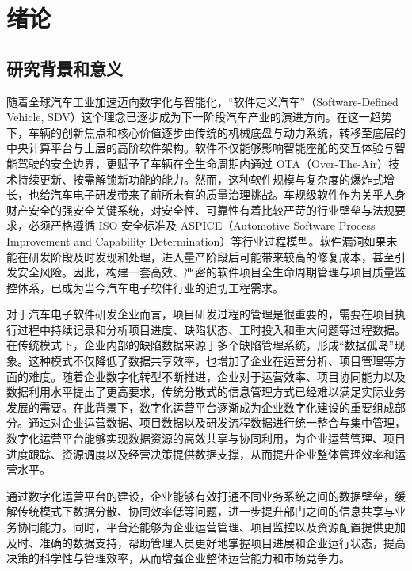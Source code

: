 \chapter{绪论}

\section{研究背景和意义}

随着全球汽车工业加速迈向数字化与智能化，“软件定义汽车”（Software-Defined Vehicle, SDV）这个理念已逐步成为下一阶段汽车产业的演进方向\cite{ibmsoftwaredefinedvehicle}。在这一趋势下，车辆的创新焦点和核心价值逐步由传统的机械底盘与动力系统，转移至底层的中央计算平台与上层的高阶软件架构。软件不仅能够影响智能座舱的交互体验与智能驾驶的安全边界，更赋予了车辆在全生命周期内通过 OTA（Over-The-Air）技术持续更新、按需解锁新功能的能力\cite{iso24089_2023}。然而，这种软件规模与复杂度的爆炸式增长，也给汽车电子研发带来了前所未有的质量治理挑战。车规级软件作为关乎人身财产安全的强安全关键系统，对安全性、可靠性有着比较严苛的行业壁垒与法规要求，必须严格遵循 ISO 安全标准\cite{iso21434_2021}及 ASPICE\cite{vda2023automotiveSpice}（Automotive Software Process Improvement and Capability Determination）等行业过程模型。软件漏洞如果未能在研发阶段及时发现和处理，进入量产阶段后可能带来较高的修复成本，甚至引发安全风险。因此，构建一套高效、严密的软件项目全生命周期管理与项目质量监控体系，已成为当今汽车电子软件行业的迫切工程需求。

对于汽车电子软件研发企业而言，项目研发过程的管理是很重要的，需要在项目执行过程中持续记录和分析项目进度、缺陷状态、工时投入和重大问题等过程数据。在传统模式下，企业内部的缺陷数据来源于多个缺陷管理系统，形成“数据孤岛”现象。这种模式不仅降低了数据共享效率，也增加了企业在运营分析、项目管理等方面的难度。随着企业数字化转型不断推进，企业对于运营效率、项目协同能力以及数据利用水平提出了更高要求，传统分散式的信息管理方式已经难以满足实际业务发展的需要。在此背景下，数字化运营平台逐渐成为企业数字化建设的重要组成部分\cite{verhoef2021digital}。通过对企业运营数据、项目数据以及研发流程数据进行统一整合与集中管理，数字化运营平台能够实现数据资源的高效共享与协同利用，为企业运营管理、项目进度跟踪、资源调度以及经营决策提供数据支撑，从而提升企业整体管理效率和运营水平。

通过数字化运营平台的建设，企业能够有效打通不同业务系统之间的数据壁垒，缓解传统模式下数据分散、协同效率低等问题，进一步提升部门之间的信息共享与业务协同能力。同时，平台还能够为企业运营管理、项目监控以及资源配置提供更加及时、准确的数据支持，帮助管理人员更好地掌握项目进展和企业运行状态，提高决策的科学性与管理效率，从而增强企业整体运营能力和市场竞争力。

